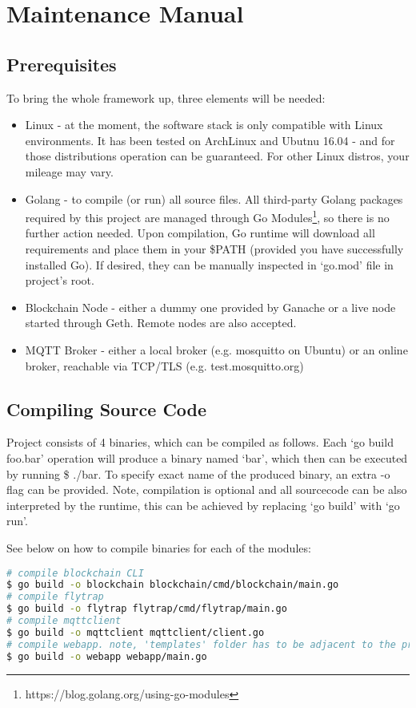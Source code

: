 \chapter{Maintenance Manual}
\section{Prerequisites}
To bring the whole framework up, three elements will be needed:
\begin{itemize}
  \item Linux - at the moment, the software stack is only compatible with Linux environments. It has been tested on ArchLinux and Ubutnu 16.04 - and for those distributions operation can be guaranteed. For other Linux distros, your mileage may vary.
  \item Golang - to compile (or run) all source files. All third-party Golang packages required by this project are managed through Go Modules\footnote{https://blog.golang.org/using-go-modules}, so there is no further action needed. Upon compilation, Go runtime will download all requirements and place them in your \$PATH (provided you have successfully installed Go). If desired, they can be manually inspected in `go.mod' file in project's root.
  \item Blockchain Node - either a dummy one provided by Ganache or a live node started through Geth. Remote nodes are also accepted.
  \item MQTT Broker - either a local broker (e.g. mosquitto on Ubuntu) or an online broker, reachable via TCP/TLS (e.g. test.mosquitto.org)
\end{itemize}
\section{Compiling Source Code}
Project consists of 4 binaries, which can be compiled as follows. Each `go build foo.bar' operation will produce a binary named `bar', which then can be executed by running \$ ./bar. To specify exact name of the produced binary, an extra -o flag can be provided. Note, compilation is optional and all sourcecode can be also interpreted by the runtime, this can be achieved by replacing `go build' with `go run'.

See below on how to compile binaries for each of the modules:
\begin{lstlisting}[language=bash,breaklines=true]
# compile blockchain CLI 
$ go build -o blockchain blockchain/cmd/blockchain/main.go 
# compile flytrap
$ go build -o flytrap flytrap/cmd/flytrap/main.go
# compile mqttclient 
$ go build -o mqttclient mqttclient/client.go
# compile webapp. note, 'templates' folder has to be adjacent to the produced binary when it is executed 
$ go build -o webapp webapp/main.go 
\end{lstlisting}
